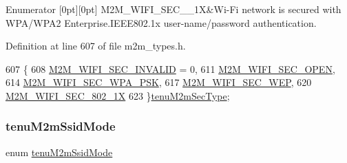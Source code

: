 \begin{DoxyEnumFields}{Enumerator}
[0pt][0pt]{}\mbox{\label{group__WlanEnums_ggaa232a09c953ec8200c13774f94107b05a0fcff26361d2f1e5378abf20e51913b5}} 
M2\+M\+\_\+\+W\+I\+F\+I\+\_\+\+S\+E\+C\+\_\+\_\+1X&Wi-\/\+Fi network is secured with W\+P\+A/\+W\+P\+A2 Enterprise.\+I\+E\+E\+E802.\+1x user-\/name/password authentication. \\
\hline

\end{DoxyEnumFields}


Definition at line 607 of file m2m\+\_\+types.\+h.


\begin{DoxyCode}
607              \{
608     \hyperlink{group__WlanEnums_ggaa232a09c953ec8200c13774f94107b05acc7f909c52688e49578009b53d61205e}{M2M\_WIFI\_SEC\_INVALID} = 0,
611     \hyperlink{group__WlanEnums_ggaa232a09c953ec8200c13774f94107b05a81b513753be791c13b73d0b2d3639b69}{M2M\_WIFI\_SEC\_OPEN},
614     \hyperlink{group__WlanEnums_ggaa232a09c953ec8200c13774f94107b05a951d0504fc8e173e60df8ee871f16697}{M2M\_WIFI\_SEC\_WPA\_PSK},
617     \hyperlink{group__WlanEnums_ggaa232a09c953ec8200c13774f94107b05a0bb64825e9635113bbab91934b214780}{M2M\_WIFI\_SEC\_WEP},
620     \hyperlink{group__WlanEnums_ggaa232a09c953ec8200c13774f94107b05a0fcff26361d2f1e5378abf20e51913b5}{M2M\_WIFI\_SEC\_802\_1X}
623 \}\hyperlink{group__WlanEnums_gaa232a09c953ec8200c13774f94107b05}{tenuM2mSecType};
\end{DoxyCode}
\mbox{\label{group__WlanEnums_gaa6553caf0dcdd1d8b908ec2383d86a60}} 
\subsubsection{\texorpdfstring{tenu\+M2m\+Ssid\+Mode}{tenuM2mSsidMode}}
{\footnotesize\ttfamily enum \hyperlink{group__WlanEnums_gaa6553caf0dcdd1d8b908ec2383d86a60}{tenu\+M2m\+Ssid\+Mode}}



